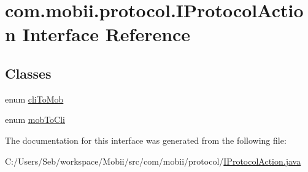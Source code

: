 \hypertarget{interfacecom_1_1mobii_1_1protocol_1_1_i_protocol_action}{\section{com.\-mobii.\-protocol.\-I\-Protocol\-Action Interface Reference}
\label{interfacecom_1_1mobii_1_1protocol_1_1_i_protocol_action}
}
\subsection*{Classes}
\begin{DoxyCompactItemize}
\item 
enum \hyperlink{enumcom_1_1mobii_1_1protocol_1_1_i_protocol_action_1_1cli_to_mob}{cli\-To\-Mob}
\item 
enum \hyperlink{enumcom_1_1mobii_1_1protocol_1_1_i_protocol_action_1_1mob_to_cli}{mob\-To\-Cli}
\end{DoxyCompactItemize}


The documentation for this interface was generated from the following file\-:\begin{DoxyCompactItemize}
\item 
C\-:/\-Users/\-Seb/workspace/\-Mobii/src/com/mobii/protocol/\hyperlink{_i_protocol_action_8java}{I\-Protocol\-Action.\-java}\end{DoxyCompactItemize}
